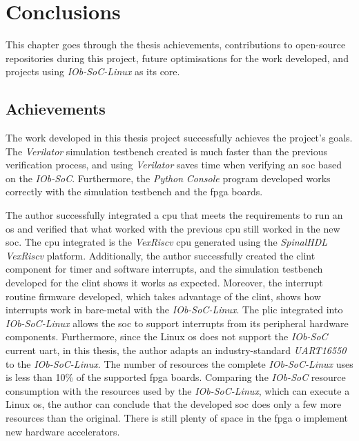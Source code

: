 \chapter{Conclusions}
\label{chapter:conclusions}
This chapter goes through the thesis achievements, contributions to open-source repositories during this project, future optimisations for the work developed, and projects using \textit{IOb-SoC-Linux} as its core.

\section{Achievements}
\label{section:achievements}
The work developed in this thesis project successfully achieves the project's goals. The \textit{Verilator} simulation testbench created is much faster than the previous verification process, and using \textit{Verilator} saves time when verifying an \acrshort{soc} based on the \textit{IOb-SoC}. Furthermore, the \textit{Python} \textit{Console} program developed works correctly with the simulation testbench and the \acrshort{fpga} boards.

The author successfully integrated a \acrshort{cpu} that meets the requirements to run an \acrshort{os} and verified that what worked with the previous \acrshort{cpu} still worked in the new \acrshort{soc}. The \acrshort{cpu} integrated is the \textit{VexRiscv} \acrshort{cpu} generated using the \textit{SpinalHDL} \textit{VexRiscv} platform. Additionally, the author successfully created the \acrshort{clint} component for timer and software interrupts, and the simulation testbench developed for the \acrshort{clint} shows it works as expected. Moreover, the interrupt routine firmware developed, which takes advantage of the \acrshort{clint}, shows how interrupts work in bare-metal with the \textit{IOb-SoC-Linux}. The \acrshort{plic} integrated into \textit{IOb-SoC-Linux} allows the \acrshort{soc} to support interrupts from its peripheral hardware components. Furthermore, since the Linux \acrshort{os} does not support the \textit{IOb-SoC} current \acrshort{uart}, in this thesis, the author adapts an industry-standard \textit{UART16550} to the \textit{IOb-SoC-Linux}. The number of resources the complete \textit{IOb-SoC-Linux} uses is less than 10\% of the supported \acrshort{fpga} boards. Comparing the \textit{IOb-SoC} resource consumption with the resources used by the \textit{IOb-SoC-Linux}, which can execute a Linux \acrshort{os}, the author can conclude that the developed \acrshort{soc} does only a few more resources than the original. There is still plenty of space in the \acrshort{fpga} o implement new hardware accelerators.

